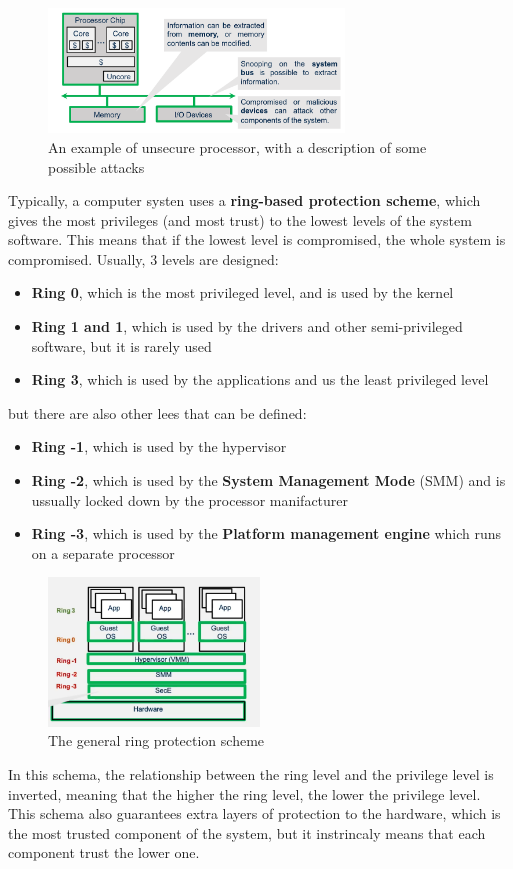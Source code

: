 \begin{figure}[H]
  \centering
  \includegraphics[width=0.7\textwidth]{img/hardware/unsecure processor.png}
  \caption{An example of unsecure processor, with a description of some possible attacks}
\end{figure}

Typically, a computer systen uses a \textbf{ring-based protection scheme}, which gives the most
privileges (and most trust) to the lowest levels of the system software. This means that if the 
lowest level is compromised, the whole system is compromised. Usually, 3 levels are designed:
\begin{itemize}
  \item \textbf{Ring 0}, which is the most privileged level, and is used by the kernel
  \item \textbf{Ring 1 and 1}, which is used by the drivers and other semi-privileged software, but
    it is rarely used
  \item \textbf{Ring 3}, which is used by the applications and us the least privileged level
\end{itemize}
but there are also other lees that can be defined:
\begin{itemize}
  \item \textbf{Ring -1}, which is used by the hypervisor
  \item \textbf{Ring -2}, which is used by the \textbf{System Management Mode} (SMM) and is ussually
    locked down by the processor manifacturer
  \item \textbf{Ring -3}, which is used by the \textbf{Platform management engine} which runs on a
    separate processor
\end{itemize}

\begin{figure}[H]
  \centering
  \includegraphics[width=0.5\textwidth]{img/hardware/ring protection scheme.png}
  \caption{The general ring protection scheme}
\end{figure}
In this schema, the relationship between the ring level and the privilege level is inverted, meaning
that the higher the ring level, the lower the privilege level. This schema also guarantees extra
layers of protection to the hardware, which is the most trusted component of the system, but it
instrincaly means that each component trust the lower one.
